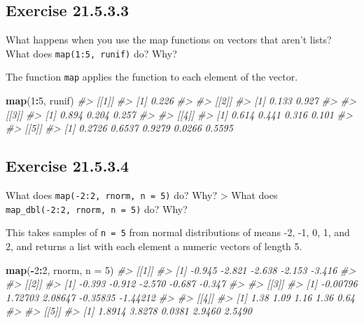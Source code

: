 \documentclass[]{book}
\newenvironment{Shaded}{\begin{snugshade}}{\end{snugshade}}
\newcommand{\CommentTok}[1]{\textcolor[rgb]{0.56,0.35,0.01}{\textit{#1}}}
\newcommand{\DataTypeTok}[1]{\textcolor[rgb]{0.13,0.29,0.53}{#1}}
\newcommand{\DecValTok}[1]{\textcolor[rgb]{0.00,0.00,0.81}{#1}}
\newcommand{\KeywordTok}[1]{\textcolor[rgb]{0.13,0.29,0.53}{\textbf{#1}}}
\newcommand{\NormalTok}[1]{#1}
\newcommand{\OperatorTok}[1]{\textcolor[rgb]{0.81,0.36,0.00}{\textbf{#1}}}
\theoremstyle{plain}
\theoremstyle{remark}
\begin{document}
\hypertarget{exercise-21.5.3.3}{%
\subsection*{\texorpdfstring{Exercise
{21.5.3.3}}{Exercise 21.5.3.3}}\label{exercise-21.5.3.3}}

What happens when you use the map functions on vectors that aren't
lists? What does \texttt{map(1:5,\ runif)} do? Why?

The function \texttt{map} applies the function to each element of the
vector.

\begin{Shaded}
\begin{Highlighting}[]
\KeywordTok{map}\NormalTok{(}\DecValTok{1}\OperatorTok{:}\DecValTok{5}\NormalTok{, runif)}
\CommentTok{#> [[1]]}
\CommentTok{#> [1] 0.226}
\CommentTok{#> }
\CommentTok{#> [[2]]}
\CommentTok{#> [1] 0.133 0.927}
\CommentTok{#> }
\CommentTok{#> [[3]]}
\CommentTok{#> [1] 0.894 0.204 0.257}
\CommentTok{#> }
\CommentTok{#> [[4]]}
\CommentTok{#> [1] 0.614 0.441 0.316 0.101}
\CommentTok{#> }
\CommentTok{#> [[5]]}
\CommentTok{#> [1] 0.2726 0.6537 0.9279 0.0266 0.5595}
\end{Highlighting}
\end{Shaded}

\hypertarget{exercise-21.5.3.4}{%
\subsection*{\texorpdfstring{Exercise
{21.5.3.4}}{Exercise 21.5.3.4}}\label{exercise-21.5.3.4}}

What does \texttt{map(-2:2,\ rnorm,\ n\ =\ 5)} do? Why? \textgreater{}
What does \texttt{map\_dbl(-2:2,\ rnorm,\ n\ =\ 5)} do? Why?

This takes samples of \texttt{n\ =\ 5} from normal distributions of
means -2, -1, 0, 1, and 2, and returns a list with each element a
numeric vectors of length 5.

\begin{Shaded}
\begin{Highlighting}[]
\KeywordTok{map}\NormalTok{(}\OperatorTok{-}\DecValTok{2}\OperatorTok{:}\DecValTok{2}\NormalTok{, rnorm, }\DataTypeTok{n =} \DecValTok{5}\NormalTok{)}
\CommentTok{#> [[1]]}
\CommentTok{#> [1] -0.945 -2.821 -2.638 -2.153 -3.416}
\CommentTok{#> }
\CommentTok{#> [[2]]}
\CommentTok{#> [1] -0.393 -0.912 -2.570 -0.687 -0.347}
\CommentTok{#> }
\CommentTok{#> [[3]]}
\CommentTok{#> [1] -0.00796  1.72703  2.08647 -0.35835 -1.44212}
\CommentTok{#> }
\CommentTok{#> [[4]]}
\CommentTok{#> [1] 1.38 1.09 1.16 1.36 0.64}
\CommentTok{#> }
\CommentTok{#> [[5]]}
\CommentTok{#> [1] 1.8914 3.8278 0.0381 2.9460 2.5490}
\end{Highlighting}
\end{Shaded}
\end{document}
